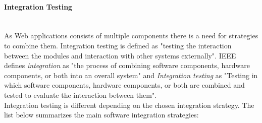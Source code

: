 \documentclass[12pt, notitlepage]{article}
\begin{document}
\paragraph{Integration Testing} ~\\
As Web applications consists of multiple components there is a need for strategies to combine them. Integration testing is defined as\cite{sw-testing-quality-assurance} "testing the interaction between the modules and interaction with other systems externally". IEEE defines
\textit{integration} as\cite{ieee-definition} "the process of combining software components, hardware components, or both into an overall system" and \textit{Integration testing} as\cite{ieee-definition} 
"Testing in which software components, hardware components, or both are combined and tested to evaluate the interaction between them".\\
Integration testing is different depending on the chosen integration strategy. The list below summarizes the main software integration strategies\cite{schattenbest}:\\
\end{document}
